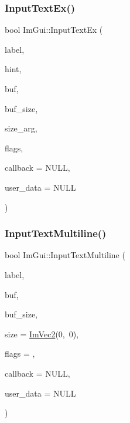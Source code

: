 \mbox{\label{namespaceImGui_af89af17ecc11653f25fea1e50e195de6}} 
\subsubsection{\texorpdfstring{Input\+Text\+Ex()}{InputTextEx()}}
{\footnotesize\ttfamily bool Im\+Gui\+::\+Input\+Text\+Ex (\begin{DoxyParamCaption}\item[{const char $\ast$}]{label,  }\item[{const char $\ast$}]{hint,  }\item[{char $\ast$}]{buf,  }\item[{int}]{buf\+\_\+size,  }\item[{const \hyperlink{structImVec2}{Im\+Vec2} \&}]{size\+\_\+arg,  }\item[{Im\+Gui\+Input\+Text\+Flags}]{flags,  }\item[{\hyperlink{imgui_8h_a484ebc32fe6c1e2d44ff601a0ca6b179}{Im\+Gui\+Input\+Text\+Callback}}]{callback = {\ttfamily NULL},  }\item[{\hyperlink{imgui__impl__opengl3__loader_8h_ac668e7cffd9e2e9cfee428b9b2f34fa7}{void} $\ast$}]{user\+\_\+data = {\ttfamily NULL} }\end{DoxyParamCaption})}

\mbox{\label{namespaceImGui_a0470693929ed9930cbf5b737577c2414}} 
\subsubsection{\texorpdfstring{Input\+Text\+Multiline()}{InputTextMultiline()}}
{\footnotesize\ttfamily bool Im\+Gui\+::\+Input\+Text\+Multiline (\begin{DoxyParamCaption}\item[{const char $\ast$}]{label,  }\item[{char $\ast$}]{buf,  }\item[{size\+\_\+t}]{buf\+\_\+size,  }\item[{const \hyperlink{structImVec2}{Im\+Vec2} \&}]{size = {\ttfamily \hyperlink{structImVec2}{Im\+Vec2}(0,~0)},  }\item[{Im\+Gui\+Input\+Text\+Flags}]{flags = {},  }\item[{\hyperlink{imgui_8h_a484ebc32fe6c1e2d44ff601a0ca6b179}{Im\+Gui\+Input\+Text\+Callback}}]{callback = {\ttfamily NULL},  }\item[{\hyperlink{imgui__impl__opengl3__loader_8h_ac668e7cffd9e2e9cfee428b9b2f34fa7}{void} $\ast$}]{user\+\_\+data = {\ttfamily NULL} }\end{DoxyParamCaption})}

